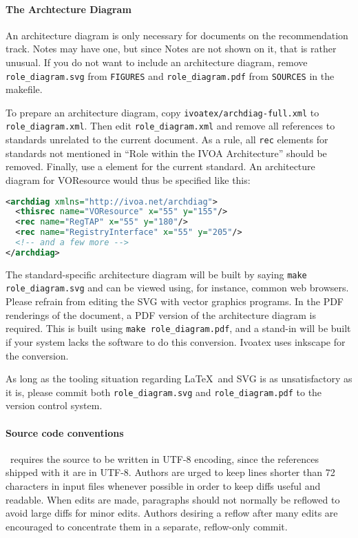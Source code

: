 \documentclass[11pt,a4paper]{ivoa}
\begin{document}
\paragraph{The Archtecture Diagram}

An architecture diagram is only 
necessary for documents on the recommendation track.  Notes may have
one, but since Notes are not shown on it, that is rather
unusual.  If you do not want to include an architecture diagram, remove
\texttt{role\_diagram.svg} from \texttt{FIGURES} and
\texttt{role\_diagram.pdf} from \texttt{SOURCES} in the makefile.

To prepare an architecture diagram, copy
\texttt{ivoatex/archdiag-full.xml} to \texttt{role\_diagram.xml}.  Then edit
\texttt{role\_diagram.xml} and remove all references to standards unrelated
to the current document.  As a rule, all \texttt{rec} elements for
standards not mentioned in
``Role within the IVOA Architecture'' should be removed.  Finally, use a
 element for the current standard.  An architecture
diagram for VOResource would thus be specified like this:

\begin{lstlisting}[language=XML,basicstyle=\footnotesize]
<archdiag xmlns="http://ivoa.net/archdiag">
  <thisrec name="VOResource" x="55" y="155"/>
  <rec name="RegTAP" x="55" y="180"/>
  <rec name="RegistryInterface" x="55" y="205"/>
  <!-- and a few more -->
</archdiag>
\end{lstlisting}

The standard-specific
architecture diagram will be built by saying \texttt{make
role\_diagram.svg} and can be viewed using, for instance, common web
browsers.  Please refrain from editing the SVG with vector graphics
programs.  In the PDF renderings of the document, 
a PDF version of the architecture diagram is
required.  This is built using \texttt{make role\_diagram.pdf}, and a
stand-in will be built if your system lacks the software to do this
conversion.  Ivoatex uses inkscape for the conversion.

As long as the tooling situation regarding \LaTeX~and SVG is as
unsatisfactory as it is, please commit both \texttt{role\_diagram.svg} and
\texttt{role\_diagram.pdf} to the version control system.

\paragraph{Source code conventions}

\ivoatex\ requires the source to be written in UTF-8 encoding, since the
references shipped with it are in UTF-8.
Authors are urged to keep lines shorter than 72 characters in input
files whenever possible in order to keep diffs useful and readable.
When edits are made, paragraphs should not normally be reflowed to avoid
large diffs for minor edits.  Authors desiring a reflow after many edits
are encouraged to concentrate them in a separate, reflow-only commit.
\end{document}
